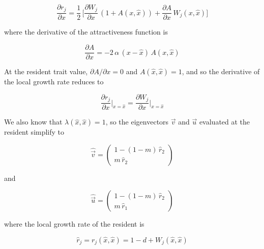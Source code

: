 \begin{equation}
    \frac{\partial r_j}{\partial x} = \frac{1}{2} \, \bigg[\frac{\partial W_j}{\partial x} \, (1 + A(x, \hat{x})) + \frac{\partial A}{\partial x} \, W_j(x, \hat{x})\bigg]
    \label{eq:deriv_local_growth}
\end{equation}

where the derivative of the attractiveness function is

\begin{equation}
    \frac{\partial A}{\partial x} = -2 \, \alpha \, (x - \hat{x}) \, A(x, \hat{x})
\end{equation}

At the resident trait value, $\partial A / \partial x = 0$ and $A(\hat{x},\hat{x}) = 1$, and so the derivative of the local growth rate reduces to

\begin{equation}
    \frac{\partial r_j}{\partial x}\bigg|_{x=\hat{x}} = \frac{\partial W_j}{\partial x}\bigg|_{x=\hat{x}} 
\end{equation}

We also know that $\lambda(\hat{x}, \hat{x}) = 1$, so the eigenvectors $\overrightarrow{v}$ and $\overrightarrow{u}$ evaluated at the resident simplify to

\begin{equation}
    \hat{\overrightarrow{v}} = 
    \begin{pmatrix}
        1 - (1-m)\,\hat{r}_2\\
        m \, \hat{r}_2
    \end{pmatrix}
    \label{eq:left_eigenvector_resident}
\end{equation}

and

\begin{equation}
    \hat{\overrightarrow{u}} = 
    \begin{pmatrix}
        1 - (1-m)\,\hat{r}_2\\
        m \, \hat{r}_1
    \end{pmatrix}
    \label{eq:right_eigenvector_resident}
\end{equation}

where the local growth rate of the resident is

\begin{equation}
    \hat{r}_j = r_j(\hat{x}, \hat{x}) = 1 - d + W_j(\hat{x}, \hat{x})
    \label{eq:local_growth_resident}
\end{equation}

